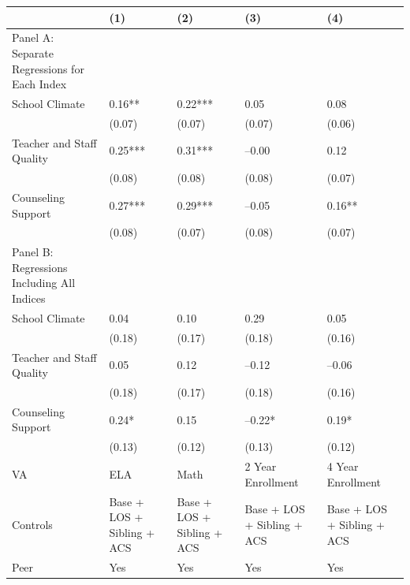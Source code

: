 \begin{table}[tbp] \centering
{}

{\footnotesize
\begin{tabularx}{\linewidth}{lCCCC}

\toprule
&{(1)}&{(2)}&{(3)}&{(4)} \tabularnewline
\midrule \addlinespace[\belowrulesep]
Panel A: Separate Regressions for Each Index&&&& \tabularnewline
\midrule School Climate&0.16**&0.22***&0.05&0.08 \tabularnewline
&(0.07)&(0.07)&(0.07)&(0.06) \tabularnewline
Teacher and Staff Quality&0.25***&0.31***&--0.00&0.12 \tabularnewline
&(0.08)&(0.08)&(0.08)&(0.07) \tabularnewline
Counseling Support&0.27***&0.29***&--0.05&0.16** \tabularnewline
&(0.08)&(0.07)&(0.08)&(0.07) \tabularnewline
\midrule \midrule Panel B: Regressions Including All Indices&&&& \tabularnewline
\midrule School Climate&0.04&0.10&0.29&0.05 \tabularnewline
&(0.18)&(0.17)&(0.18)&(0.16) \tabularnewline
Teacher and Staff Quality&0.05&0.12&--0.12&--0.06 \tabularnewline
&(0.18)&(0.17)&(0.18)&(0.16) \tabularnewline
Counseling Support&0.24*&0.15&--0.22*&0.19* \tabularnewline
&(0.13)&(0.12)&(0.13)&(0.12) \tabularnewline
\midrule VA&ELA&Math&2 Year Enrollment&4 Year Enrollment \tabularnewline
Controls&Base + LOS + Sibling + ACS&Base + LOS + Sibling + ACS&Base + LOS + Sibling + ACS&Base + LOS + Sibling + ACS \tabularnewline
Peer&Yes&Yes&Yes&Yes \tabularnewline
\bottomrule 

\end{tabularx}
}
\end{table}
